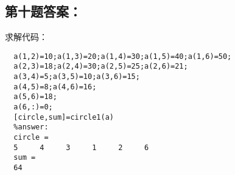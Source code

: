 \subsection{第十题答案：}
\noindent 求解代码：
\begin{lstlisting}
  a(1,2)=10;a(1,3)=20;a(1,4)=30;a(1,5)=40;a(1,6)=50;
  a(2,3)=18;a(2,4)=30;a(2,5)=25;a(2,6)=21;
  a(3,4)=5;a(3,5)=10;a(3,6)=15;
  a(4,5)=8;a(4,6)=16;
  a(5,6)=18;
  a(6,:)=0;
  [circle,sum]=circle1(a)
  %answer:
  circle =
  5     4     3     1     2     6
  sum =
  64
\end{lstlisting}
